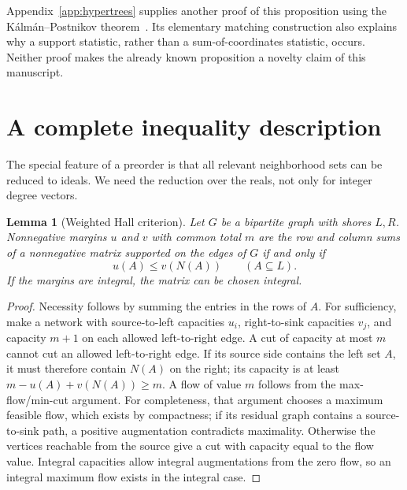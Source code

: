 \documentclass[11pt]{article}
\numberwithin{equation}{section}
\newtheorem{lemma}[theorem]{Lemma}
\theoremstyle{definition}
\begin{document}
Appendix~\ref{app:hypertrees} supplies another proof of this proposition using
the K\'alm\'an--Postnikov theorem~\cite{KP}. Its elementary matching construction
also explains why a support statistic, rather than a sum-of-coordinates
statistic, occurs. Neither proof makes the already known proposition a novelty
claim of this manuscript.

\section{A complete inequality description}\label{sec:hall}

The special feature of a preorder is that all relevant neighborhood sets can
be reduced to ideals. We need the reduction over the reals, not only for
integer degree vectors.

\begin{lemma}[Weighted Hall criterion]\label{lem:flow}
Let $G$ be a bipartite graph with shores $L,R$. Nonnegative margins $u$ and $v$
with common total $m$ are the row and column sums of a nonnegative matrix
supported on the edges of $G$ if and only if
\begin{equation}
 u(A)\leq v(N(A))\qquad(A\subseteq L).\label{eq:hall}
\end{equation}
If the margins are integral, the matrix can be chosen integral.
\end{lemma}
\begin{proof}
Necessity follows by summing the entries in the rows of $A$. For sufficiency,
make a network with source-to-left capacities $u_i$, right-to-sink capacities
$v_j$, and capacity $m+1$ on each allowed left-to-right edge. A cut of capacity
at most $m$ cannot cut an allowed left-to-right edge. If its source side
contains the left set $A$, it must therefore contain $N(A)$ on the right; its
capacity is at least $m-u(A)+v(N(A))\geq m$. A flow of value $m$ follows from
the max-flow/min-cut argument. For completeness, that argument chooses a
maximum feasible flow, which exists by compactness; if its residual graph
contains a source-to-sink path, a positive augmentation contradicts maximality.
Otherwise the vertices reachable from the source give a cut with capacity equal
to the flow value. Integral capacities allow integral augmentations from the
zero flow, so an integral maximum flow exists in the integral case.
\end{proof}
\end{document}
